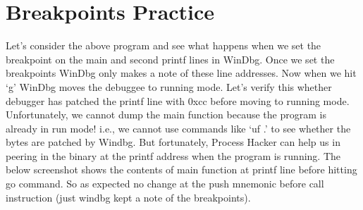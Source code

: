 \documentclass{article}
\begin{document}
\section{Breakpoints Practice}
Let’s consider the above program and see what happens when we set the breakpoint on the main and second printf lines in WinDbg. Once we set the breakpoints WinDbg only makes a note of these line addresses. Now when we hit ‘g’ WinDbg moves the debuggee to running mode. Let’s verify this whether debugger has patched the printf line with 0xcc before moving to running mode. Unfortunately, we cannot dump the main function because the program is already in run mode! i.e., we cannot use commands like ‘uf .’  to see whether the bytes are patched by Windbg. But fortunately, Process Hacker can help us in peering in the binary at the printf address when the program is running.  The below screenshot shows the contents of main function at printf line before hitting go command. So as expected no change at the push mnemonic before call instruction (just windbg kept a note of the breakpoints).
\end{document}
